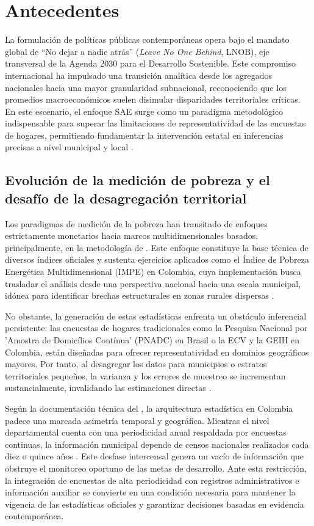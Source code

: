 
\section{Antecedentes}
\label{sec:antecedentes}
    La formulación de políticas públicas contemporáneas opera bajo el mandato global de ``No dejar a nadie atrás'' (\textit{Leave No One Behind}, LNOB), eje transversal de la Agenda 2030 para el Desarrollo Sostenible. Este compromiso internacional ha impulsado una transición analítica desde los agregados nacionales hacia una mayor granularidad subnacional, reconociendo que los promedios macroeconómicos suelen disimular disparidades territoriales críticas. En este escenario, el enfoque SAE surge como un paradigma metodológico indispensable para superar las limitaciones de representatividad de las encuestas de hogares, permitiendo fundamentar la intervención estatal en inferencias precisas a nivel municipal y local \cite{cepal2024, dane2024}.

\subsection{Evolución de la medición de pobreza y el desafío de la desagregación territorial}
        Los paradigmas de medición de la pobreza han transitado de enfoques estrictamente monetarios hacia marcos multidimensionales basados, principalmente, en la metodología de \textcite{alkire2011}. Este enfoque constituye la base técnica de diversos índices oficiales y sustenta ejercicios aplicados como el Índice de Pobreza Energética Multidimensional (IMPE) en Colombia, cuya implementación busca trasladar el análisis desde una perspectiva nacional hacia una escala municipal, idónea para identificar brechas estructurales en zonas rurales dispersas \cite{promigas2025}.
    
        No obstante, la generación de estas estadísticas enfrenta un obstáculo inferencial persistente: las encuestas de hogares tradicionales como la Pesquisa Nacional por 'Amostra de Domicílios Contínua' (PNADC) en Brasil o la ECV y la GEIH en Colombia, están diseñadas para ofrecer representatividad en dominios geográficos mayores. Por tanto, al desagregar los datos para municipios o estratos territoriales pequeños, la varianza y los errores de muestreo se incrementan sustancialmente, invalidando las estimaciones directas \cite{moura2021, dane2024}.
    
        Según la documentación técnica del \textcite{DANE_PobrezaMultidimensional_2023}, la arquitectura estadística en Colombia padece una marcada asimetría temporal y geográfica. Mientras el nivel departamental cuenta con una periodicidad anual respaldada por encuestas continuas, la información municipal depende de censos nacionales realizados cada diez o quince años \cite{dane2024}. Este desfase intercensal genera un vacío de información que obstruye el monitoreo oportuno de las metas de desarrollo. Ante esta restricción, la integración de encuestas de alta periodicidad con registros administrativos e información auxiliar se convierte en una condición necesaria para mantener la vigencia de las estadísticas oficiales y garantizar decisiones basadas en evidencia contemporánea.
    
